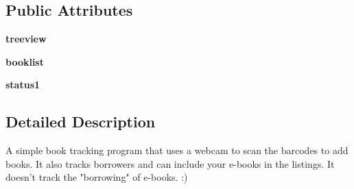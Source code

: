 \subsection*{Public Attributes}
\begin{DoxyCompactItemize}
\item 
\hypertarget{classlibrarian_1_1librarian_a388a1808d92bbfe00eb3202255a18d67}{
{\bfseries treeview}}
\label{classlibrarian_1_1librarian_a388a1808d92bbfe00eb3202255a18d67}

\item 
\hypertarget{classlibrarian_1_1librarian_a2e4ace15e14d76e6efcc52394c2735d7}{
{\bfseries booklist}}
\label{classlibrarian_1_1librarian_a2e4ace15e14d76e6efcc52394c2735d7}

\item 
\hypertarget{classlibrarian_1_1librarian_a61d3be0b3ed7deafe20920ba3251ad60}{
{\bfseries status1}}
\label{classlibrarian_1_1librarian_a61d3be0b3ed7deafe20920ba3251ad60}

\end{DoxyCompactItemize}


\subsection{Detailed Description}
\begin{DoxyVerb}
A simple book tracking program that uses a webcam to scan the barcodes
to add books.  It also tracks borrowers and can include your e-books
in the listings.  It doesn't track the "borrowing" of e-books. :)
\end{DoxyVerb}
 

